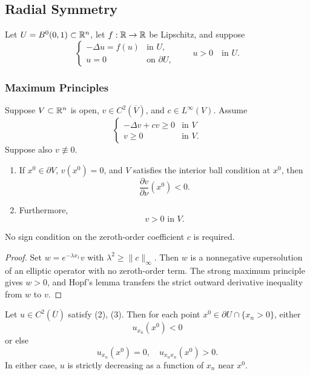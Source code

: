 \subsection{Radial Symmetry}
\label{sec:radial-symmetry}

Let $U=B^0(0,1)\subset\mathbb{R}^n$, let $f:\mathbb{R}\to\mathbb{R}$ be Lipschitz, and suppose
\[
\begin{cases}
-\Delta u=f(u) & \text{in }U,\\
u=0 & \text{on }\partial U,
\end{cases}
\tag{2}
\qquad
u>0\quad\text{in }U.
\tag{3}
\]

\subsubsection{Maximum Principles}
\label{sec:maximum-principles-radial-symmetry}

\begin{lemma}
\label{lem:hopf-lemma-refinement}

Suppose $V \subset \mathbb{R}^n$ is open, $v \in C^2(\overline{V})$, and $c \in L^\infty(V)$. Assume
\[
\begin{cases} -\Delta v + cv \geq 0 & \text{in } V \\ v \geq 0 & \text{in } V. \end{cases}
\tag{4}
\]
Suppose also $v \not\equiv 0$.
\begin{enumerate}
\item[(i)] If $x^0 \in \partial V$, $v(x^0) = 0$, and $V$ satisfies the interior ball condition at $x^0$, then
\[
\frac{\partial v}{\partial \nu}(x^0) < 0.
\tag{5}
\]
\item[(ii)] Furthermore,
\[
v > 0 \text{ in } V.
\tag{6}
\]
\end{enumerate}
No sign condition on the zeroth-order coefficient $c$ is required.
\end{lemma}

\begin{proof}
\sketch Set $w=e^{-\lambda x_1}v$ with $\lambda^2\geq\|c\|_\infty$. Then $w$ is a nonnegative supersolution of an elliptic operator with no zeroth-order term. The strong maximum principle gives $w>0$, and Hopf's lemma transfers the strict outward derivative inequality from $w$ to $v$.
\end{proof}

\begin{lemma}
\label{lem:boundary-estimates-radial-symmetry}

Let $u \in C^2(\overline{U})$ satisfy (2), (3). Then for each point $x^0 \in \partial U \cap \{x_n > 0\}$, either
\[
u_{x_n}(x^0) < 0
\tag{7}
\]
or else
\[
u_{x_n}(x^0) = 0, \quad u_{x_nx_n}(x^0) > 0.
\tag{8}
\]
In either case, $u$ is strictly decreasing as a function of $x_n$ near $x^0$.
\end{lemma}

